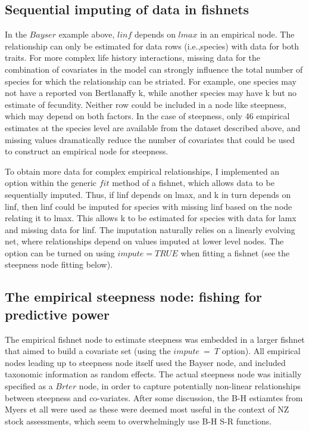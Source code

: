 \documentclass{dragonfly-report}
\begin{document}
\subsection{Sequential imputing of data in fishnets}

In the $Bayser$ example above, $linf$ depends on $lmax$ in an empirical node. The relationship can only be estimated for data rows (i.e.,species) with data for both traits. For more complex life history interactions, missing data for the combination of covariates in the model can strongly influence the total number of species for which the relationship can be striated. For example, one species may not have a reported von Bertlanaffy k, while another species may have k but no estimate of fecundity. Neither row could be included in a node like steepness, which may depend on both factors. In the case of steepness, only 46 empirical estimates at the species level are available from the dataset described above, and missing values dramatically reduce the number of covariates that could be used to construct an empirical node for steepness.

To obtain more data for complex empirical relationships, I implemented an option within the generic $fit$ method of a fishnet, which allows data to be sequentially imputed. Thus, if linf depends on lmax, and k in turn depends on linf, then linf could be imputed for species with missing linf based on the node relating it to lmax. This allows k to be estimated for species with data for lamx and missing data for linf. The imputation naturally relies on a linearly evolving net, where relationships depend on  values imputed at lower level nodes. The option can be turned on using $impute = TRUE$ when fitting a fishnet (see the steepness node fitting below).

\subsection{The empirical steepness node: fishing for predictive power}

The empirical fishnet node to estimate steepness was embedded in a larger fishnet that aimed to build a covariate set (using the $impute~=~T$ option). All empirical nodes leading up to steepness node itself used the Bayser node, and included taxonomic information as random effects. The actual steepness node was initially specified as a $Brter$ node, in order to capture potentially non-linear relationships between steepness and co-variates. After some discussion, the B-H estiamtes from Myers et all were used as these were deemed most useful in the context of NZ stock assessments, which seem to overwhelmingly use B-H S-R functions.
\end{document}
